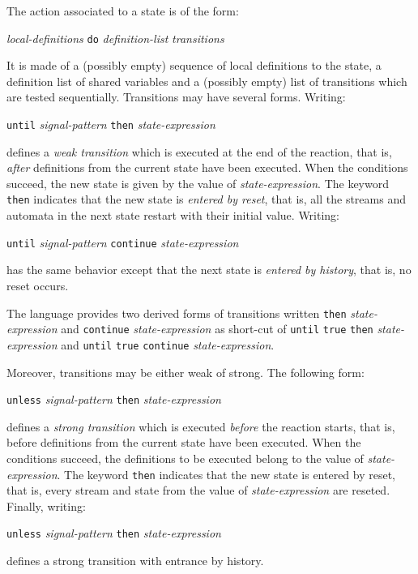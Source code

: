 \documentclass[11pt,titlepage,twoside]{report}
\newcommand{\Then}{\mbox{{\tt then}}}
\newcommand{\Until}{\mbox{\tt until}}
\newcommand{\Unless}{\mbox{\tt unless}}
\newcommand{\Continue}{\mbox{\tt continue}}
\newcommand{\Do}{\mbox{\tt do}}
\newcommand{\term}[1]{{\tt #1}}
\newcommand{\nterm}[1]{{\em #1}}
\begin{document}
The action associated to a state is of the form:
\begin{center}
  \nterm{local-definitions} \term{\Do} \nterm{definition-list} 
  \nterm{transitions}
\end{center}
It is made of a (possibly empty) sequence of local definitions to the
state, a definition list of shared variables and a (possibly empty)
list of transitions which are tested sequentially. Transitions may
have several forms.  Writing:
\begin{center}
  \term{\Until} \nterm{signal-pattern} \term{\Then} \nterm{state-expression}
\end{center}
defines a {\em weak transition} which is executed at the end of the
reaction, that is, {\em after} definitions from the current state have
been executed. When the conditions succeed, the new state is given by
the value of \nterm{state-expression}. The keyword \term{\Then}
indicates that the new state is {\em entered by reset}, that is, all
the streams and automata in the next state restart with their initial
value.  Writing: \begin{center} \term{\Until} \nterm{signal-pattern} 
\term{\Continue} \nterm{state-expression}
\end{center}
has the same behavior except that the next state is {\em entered by
  history}, that is, no reset occurs.

The language provides two derived forms of transitions written
\term{\Then} \nterm{state-expression} and \term{\Continue}
\nterm{state-expression} as short-cut of \term{\Until} {\tt true}
\term{\Then} \nterm{state-expression} and \term{\Until} {\tt true}
\term{\Continue} \nterm{state-expression}.

Moreover, transitions may be either weak of strong. The following form:
\begin{center}
  \term{\Unless} \nterm{signal-pattern} \term{\Then} \nterm{state-expression}
\end{center}
defines a {\em strong transition} which is executed {\em before} the
reaction starts, that is, before definitions from the current state
have been executed. When the conditions succeed, the definitions to be
executed belong to the value of \nterm{state-expression}. The keyword
\term{\Then} indicates that the new state is entered by reset, that is,
every stream and state from the value of \nterm{state-expression} are
reseted. Finally, writing: \begin{center}
  \term{\Unless} \nterm{signal-pattern} \term{\Then} \nterm{state-expression}
\end{center}
defines a strong transition with entrance by history.
\end{document}
